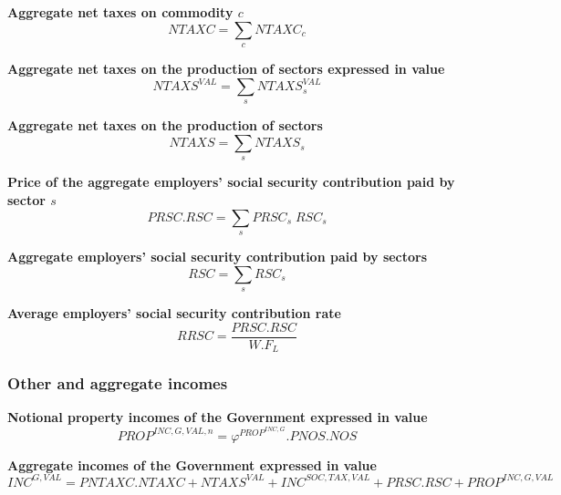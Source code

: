 \documentclass[12pt]{article}
\numberwithin{equation}{section}
\begin{document}
\noindent \textbf{Aggregate net taxes on commodity $c$} 
\begin{dmath}
NTAXC = \sum_{c} NTAXC_{c}
\label{government.mdlNTAXC}
\end{dmath}

\noindent \textbf{Aggregate net taxes on the production of sectors expressed in value} 
\begin{dmath}
NTAXS^{VAL} = \sum_{s} NTAXS^{VAL}_{s}
\label{government.mdlNTAXS_VAL}
\end{dmath}

\noindent \textbf{Aggregate net taxes on the production of sectors} 
\begin{dmath}
NTAXS = \sum_{s} NTAXS_{s}
\label{government.mdlNTAXS}
\end{dmath}

\noindent \textbf{Price of the aggregate employers' social security contribution paid by sector $s$} 
\begin{dmath}
PRSC . RSC = \sum_{s} PRSC_{s} \; RSC_{s}
\label{government.mdlPRSC}
\end{dmath}

\noindent \textbf{Aggregate employers' social security contribution paid by sectors} 
\begin{dmath}
RSC = \sum_{s} RSC_{s}
\label{government.mdlRSC}
\end{dmath}

\noindent \textbf{Average employers' social security contribution rate} 
\begin{dmath}
RRSC = \frac{PRSC . RSC}{W . F_{L}}
\label{government.mdlRRSC}
\end{dmath}



\subsubsection{Other and aggregate incomes}



\noindent \textbf{Notional property incomes of the Government expressed in value} 
\begin{dmath}
PROP^{INC,G,VAL,n} = \varphi^{PROP^{INC,G}} . PNOS . NOS
\label{government.mdlPROP_INC_G_VAL_n}
\end{dmath}

\noindent \textbf{Aggregate incomes of the Government expressed in value} 
\begin{dmath}
INC^{G,VAL} = PNTAXC . NTAXC + NTAXS^{VAL} + INC^{SOC,TAX,VAL} + PRSC . RSC + PROP^{INC,G,VAL}
\label{government.mdlINC_G_VAL}
\end{dmath}
\end{document}
